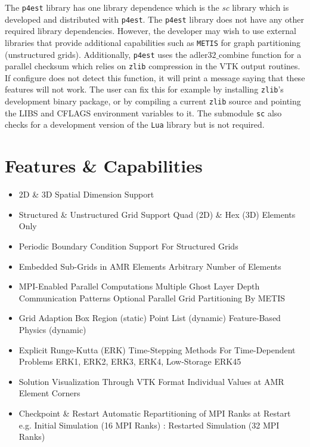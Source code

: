 \documentclass[11pt]{book}
\begin{document}
The \texttt{p4est} library has one library dependence which is the \textit{sc} library which is developed and distributed with \texttt{p4est}.
The \texttt{p4est} library does not have any other required library dependencies. 
However, the developer may wish to use external libraries that provide additional capabilities such as \texttt{METIS} for graph partitioning (unstructured grids).
Additionally, \texttt{p4est} uses the adler$32\_$combine function for a parallel checksum which relies on \texttt{zlib} compression in the VTK output routines. 
If configure does not detect this function, it will print a message saying that these features will not work. 
The user can fix this for example by installing \texttt{zlib}'s development binary package, 
or by compiling a current \texttt{zlib} source and pointing the LIBS and CFLAGS environment variables to it. 
The submodule \texttt{sc} also checks for a development version of the \texttt{Lua} library but is not required.


\newpage
\section{Features \& Capabilities}
\begin{itemize}
  \item 2D \& 3D Spatial Dimension Support
  \item Structured \& Unstructured Grid Support
  	\subitem Quad (2D) \& Hex (3D) Elements Only
  \item Periodic Boundary Condition Support For Structured Grids
  \item Embedded Sub-Grids in AMR Elements
    \subitem Arbitrary Number of Elements 
  \item MPI-Enabled Parallel Computations
    \subitem Multiple Ghost Layer Depth Communication Patterns
    \subitem Optional Parallel Grid Partitioning By METIS
  \item Grid Adaption
    \subitem Box Region (static)
    \subitem Point List (dynamic)
    \subitem Feature-Based Physics (dynamic)
  \item Explicit Runge-Kutta (ERK) Time-Stepping Methods For Time-Dependent Problems
  	\subitem ERK1, ERK2, ERK3, ERK4, Low-Storage ERK45
  \item Solution Visualization Through VTK Format
  	\subitem Individual Values at AMR Element Corners
  \item Checkpoint \& Restart 
  	\subitem Automatic Repartitioning of MPI Ranks at Restart
  	\subitem e.g. Initial Simulation (16 MPI Ranks) : Restarted Simulation (32 MPI Ranks)
\end{itemize}
\end{document}
